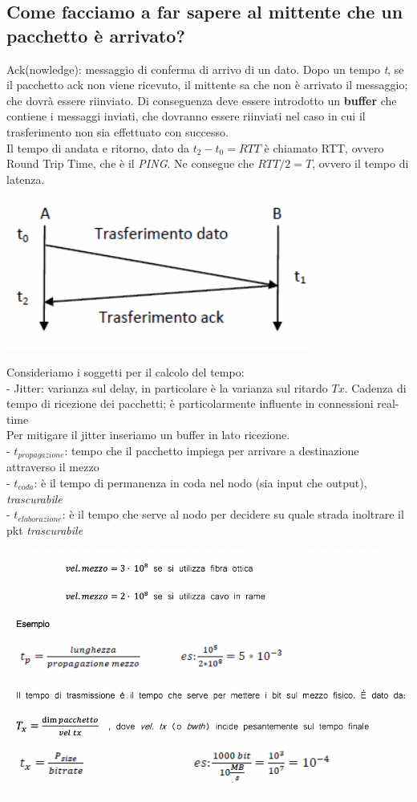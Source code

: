 \documentclass[11pt, oneside]{article}   	%
\begin{document}
\subsection*{Come facciamo a far sapere al mittente che un pacchetto è arrivato?}
Ack(nowledge): messaggio di conferma di arrivo di un dato. Dopo un tempo \emph{t}, se il pacchetto ack non viene ricevuto, il mittente sa che non è arrivato il messaggio; che dovrà essere riinviato. Di conseguenza deve essere introdotto un \textbf{buffer} che contiene i messaggi inviati, che dovranno essere riinviati nel caso in cui il trasferimento non sia effettuato con successo.\\
Il tempo di andata e ritorno, dato da \(t_2 - t_0 = RTT\) è chiamato RTT, ovvero Round Trip Time, che è il \emph{PING}. Ne consegue che \(RTT/2 = T\), ovvero il tempo di latenza.	
\begin{center}
\includegraphics[scale=0.6]{ack}
\end{center}
Consideriamo i soggetti per il calcolo del tempo:\\
- Jitter: varianza sul delay, in particolare è la varianza sul ritardo \(Tx\). Cadenza di tempo di ricezione dei pacchetti; è particolarmente influente in connessioni real-time\\Per mitigare il jitter inseriamo un buffer in lato ricezione.\\
- \(t_{propagazione} \): tempo che il pacchetto impiega per arrivare a destinazione attraverso il mezzo\\
- \(t_{coda} \): è il tempo di permanenza in coda nel nodo (sia input che output), \emph{trascurabile}\\
- \(t_{elaborazione} \): è il tempo che serve al nodo per decidere su quale strada inoltrare il pkt \emph{trascurabile}\\
\begin{center}
\includegraphics[scale=0.6]{3}
\end{center}
\end{document}
